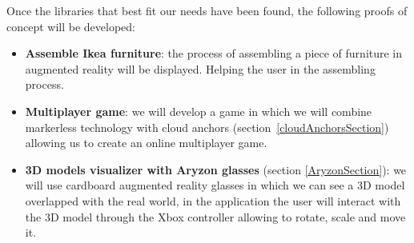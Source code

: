 Once the libraries that best fit our needs have been found, the following proofs of concept will be developed:
\begin{itemize}
\item \textbf{Assemble Ikea furniture}: the process of assembling a piece of furniture in augmented reality will be displayed. Helping the user in the assembling process.
\item \textbf{Multiplayer game}: we will develop a game in which we will combine markerless technology with cloud anchors (section~\ref{cloudAnchorsSection}) allowing us to create an online multiplayer game.
\item \textbf{3D models visualizer with Aryzon glasses} (section \ref{AryzonSection}): we will use cardboard augmented reality glasses in which we can see a 3D model overlapped with the real world, in the application the user will interact with the 3D model through the Xbox controller allowing to rotate, scale and move it.
\end{itemize}
























